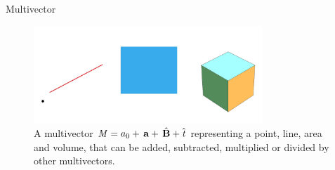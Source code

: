 \documentclass[handout,10pt]{beamer}
\begin{document}
\begin{frame}[fragile]{Multivector}

\begin{figure}[htb]

\begin{center}
\includegraphics[width=3.4in]{Multi}
\end{center}

\caption{A multivector $\mathit{M} = 
a_0 + \, \mathbf{a} + \, \hat{\mathbf{B}} +  \hat{\mathit{t}}$ representing a point, line, area and volume, that can be added, subtracted, multiplied or divided by other multivectors. \label{MultiPic}}

\end{figure}


\end{frame}
\end{document}
